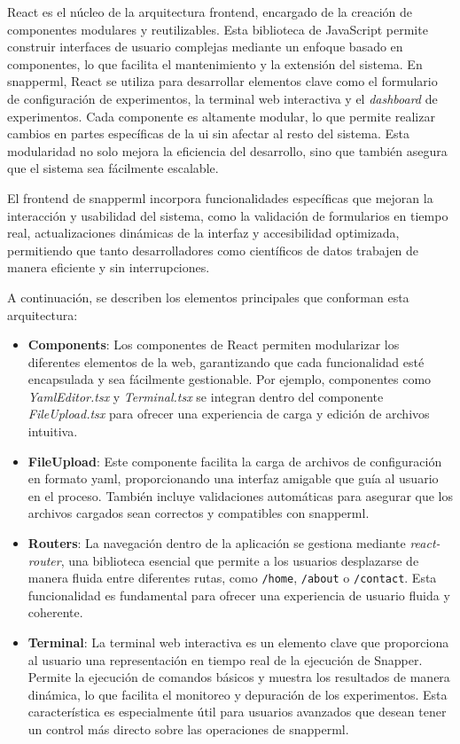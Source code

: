 React es el núcleo de la arquitectura \gls{frontend}, encargado de la creación de componentes modulares y reutilizables. Esta biblioteca de JavaScript permite construir interfaces de usuario complejas mediante un enfoque basado en componentes, lo que facilita el mantenimiento y la extensión del sistema. En \Gls{snapperml}, React se utiliza para desarrollar elementos clave como el formulario de configuración de experimentos, la terminal web interactiva y el \textit{dashboard} de experimentos. Cada componente es altamente modular, lo que permite realizar cambios en partes específicas de la \acrshort{ui} sin afectar al resto del sistema. Esta modularidad no solo mejora la eficiencia del desarrollo, sino que también asegura que el sistema sea fácilmente escalable.

El \gls{frontend} de \Gls{snapperml} incorpora funcionalidades específicas que mejoran la interacción y usabilidad del sistema, como la validación de formularios en tiempo real, actualizaciones dinámicas de la interfaz y accesibilidad optimizada, permitiendo que tanto desarrolladores como científicos de datos trabajen de manera eficiente y sin interrupciones.

A continuación, se describen los elementos principales que conforman esta arquitectura:
\begin{itemize}
    \item \textbf{Components}: Los componentes de React permiten modularizar los diferentes elementos de la web, garantizando que cada funcionalidad esté encapsulada y sea fácilmente gestionable. Por ejemplo, componentes como \textit{YamlEditor.tsx} y \textit{Terminal.tsx} se integran dentro del componente \textit{FileUpload.tsx} para ofrecer una experiencia de carga y edición de archivos intuitiva.

    \item \textbf{FileUpload}: Este componente facilita la carga de archivos de configuración en formato \acrshort{yaml}, proporcionando una interfaz amigable que guía al usuario en el proceso. También incluye validaciones automáticas para asegurar que los archivos cargados sean correctos y compatibles con \Gls{snapperml}.

    \item \textbf{Routers}: La navegación dentro de la aplicación se gestiona mediante \textit{react-router}, una biblioteca esencial que permite a los usuarios desplazarse de manera fluida entre diferentes rutas, como \texttt{/home}, \texttt{/about} o \texttt{/contact}. Esta funcionalidad es fundamental para ofrecer una experiencia de usuario fluida y coherente.

    \item \textbf{Terminal}: La terminal web interactiva es un elemento clave que proporciona al usuario una representación en tiempo real de la ejecución de Snapper. Permite la ejecución de comandos básicos y muestra los resultados de manera dinámica, lo que facilita el monitoreo y depuración de los experimentos. Esta característica es especialmente útil para usuarios avanzados que desean tener un control más directo sobre las operaciones de \Gls{snapperml}.
\end{itemize}

